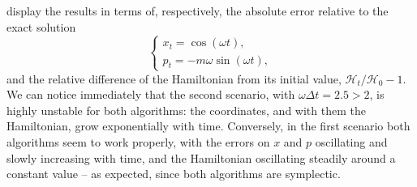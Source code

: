  display the results in terms of, respectively, the
absolute error relative to the exact solution
\begin{equation}
  \begin{cases}
    x_{t} = \cos(\omega t), \\
    p_{t} = -m \omega \sin(\omega t),
  \end{cases}
\end{equation}
and the relative difference of the Hamiltonian from its initial value,
$\mathcal{H}_{t} / \mathcal{H}_{0} - 1$. We can notice immediately that the
second scenario, with $\omega \Delta t = \num{2.5} > 2$, is highly unstable
for both algorithms: the coordinates, and with them the Hamiltonian, grow
exponentially with time. Conversely, in the first scenario both algorithms seem
to work properly, with the errors on $x$ and $p$ oscillating and slowly
increasing with time, and the Hamiltonian oscillating steadily around a constant
value -- as expected, since both algorithms are symplectic.
